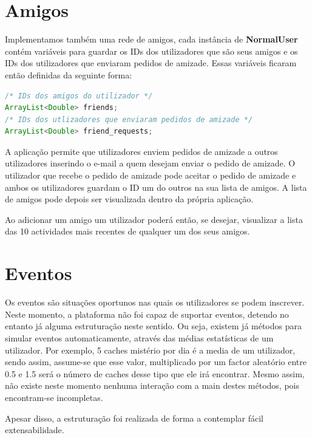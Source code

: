\documentclass{article}
\begin{document}
\section{Amigos}
\par Implementamos também uma rede de amigos, cada instância de \textbf{NormalUser} contém variáveis para guardar
os IDs dos utilizadores que são seus amigos e os IDs dos utilizadores que enviaram pedidos de amizade.
Essas variáveis ficaram então definidas da seguinte forma:
\begin{lstlisting}[language=Java]
/* IDs dos amigos do utilizador */
ArrayList<Double> friends;
/* IDs dos utlizadores que enviaram pedidos de amizade */
ArrayList<Double> friend_requests;
\end{lstlisting}
\par A aplicação permite que utilizadores enviem pedidos de amizade a outros utilizadores inserindo o e-mail a quem desejam
enviar o pedido de amizade. O utilizador que recebe o pedido de amizade pode aceitar o pedido de amizade e ambos os
utilizadores guardam o ID um do outros na sua lista de amigos. A lista de amigos pode depois ser visualizada dentro da
própria aplicação.
\par Ao adicionar um amigo um utilizador poderá então, se desejar, visualizar a lista das 10 actividades mais recentes de qualquer um dos seus amigos.

\pagebreak
\section{Eventos}

Os eventos são situações oportunos nas quais os utilizadores se podem inscrever.  Neste momento, a plataforma não foi capaz de suportar eventos, detendo no entanto já alguma estruturação neste sentido. Ou seja, existem já métodos para simular eventos automaticamente, através das médias estatísticas de um utilizador. Por exemplo, 5 caches mistério por dia é a media de um utilizador, sendo assim, assume-se que esse valor, multiplicado por um factor aleatório entre 0.5 e 1.5 será o número de caches desse tipo que ele irá encontrar. Mesmo assim, não existe neste momento nenhuma interação com a main destes métodos, pois encontram-se incompletas.

Apesar disso, a estruturação foi realizada de forma a contemplar fácil extensabilidade.
\end{document}
